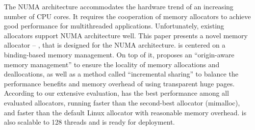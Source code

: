 The NUMA architecture accommodates the hardware trend of an increasing number of CPU cores. It requires the cooperation of memory allocators to achieve good performance for multithreaded applications. Unfortunately, existing allocators  support NUMA architecture well.
This paper presents a novel memory allocator -- \NM{}, that is designed for the NUMA architecture. \NM{} is centered on a binding-based memory management. On top of it, \NM{} proposes an ``origin-aware memory management'' to ensure the locality of memory allocations and deallocations, as well as a method called ``incremental sharing'' to balance the performance benefits and memory overhead of using transparent huge pages.
According to our extensive evaluation, \NM{} has the best performance among all evaluated allocators, running  faster than the second-best allocator (mimalloc), and  faster than the default Linux allocator with reasonable memory overhead. 
\NM{} is also scalable to 128 threads and is ready for deployment.